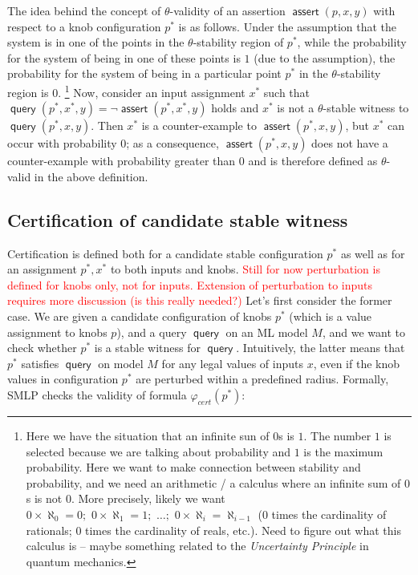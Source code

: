 \documentclass[a4paper,parskip=half]{article} %
\newcommand*\eqdef=
\newcommand*\query{\operatorname{\mathsf{query}}}
\newcommand*\assert{\operatorname{\mathsf{assert}}}
\newcommand\todozk[1]{\textcolor{red}{#1}}
\newcommand*\ZK{\todozk}
\begin{document}
The idea behind the concept of $\theta$-validity of an assertion $\assert(p, x,y)$ with respect to a knob configuration $p^*$ is as follows. 
Under the assumption that the system is 
in one of the points in the $\theta$-stability region of $p^*$,  while the probability for the system of being in one of these points is $1$ 
(due to the assumption), the probability for the system of being in a particular point $p^*$ in the $\theta$-stability region is $0$.
\footnote{Here we have the situation that an infinite sun of $0$s is $1$. The number $1$ is selected because we are talking 
about probability and $1$ is the maximum probability. Here we want to make connection between stability and probability,
and we need an arithmetic / a calculus where an infinite sum of $0$s is not $0$. More precisely, likely we want $0 \times \aleph_0 = 0;\,\,
0 \times \aleph_1 = 1; \,\, \ldots ; \,\, 0 \times \aleph_i =  \aleph_{i-1} $ ($0$ times the cardinality of rationals;
 $0$ times the cardinality of reals, etc.).  Need to figure out what this calculus 
is -- maybe something related to the \emph{Uncertainty Principle} in quantum mechanics.} 
Now, consider  an input assignment $x^*$ such that $\query(p^*, x^*,y) \eqdef \neg \assert(p^*, x^*,y)$  holds and $x^*$ is not
a  $\theta$-stable witness to $\query(p^*,x,y)$. Then $x^*$ is a counter-example to $\assert(p^*, x, y)$, but $x^*$ can occur with probability $0$; 
as a consequence, $\assert(p^*, x, y)$ does not have a counter-example with probability greater than $0$ and is therefore defined 
as $\theta$-valid in the above definition.




\subsection{Certification of candidate stable witness}\label{sect:certify}



Certification is defined both for a candidate stable configuration $p^*$ as well as for an assignment $p^*, x^*$ to both inputs and knobs.
\ZK{Still for now perturbation is defined for knobs only, not for inputs. Extension of perturbation to inputs requires more discussion (is this really needed?)}
Let's first consider the former case.
We are given a candidate configuration of knobs $p^*$ (which is a value assignment to knobs $p$), and a query $\query$ on an 
ML model $M$, and we want to check whether $p^*$ is a stable witness for $\query$. Intuitively, the latter means that $p^*$
satisfies $\query$ on model $M$ for any legal values of inputs $x$, even if the knob values in configuration $p^*$ are perturbed 
within a predefined radius. Formally, SMLP checks the validity of formula $\varphi_{\mathit{cert}}(p^*)$: 
\end{document}
